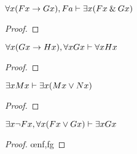 \begin{earg}


\noindent\begin{minipage}{0.99\textwidth}
\item $\forall x(Fx \rightarrow Gx), Fa \vdash \exists x(Fx \mathbin{\&} Gx)$

\begin{proof}
	 \pr{}
	 \pr{}
	 
	 
	 
	 	
\end{proof}
\bigskip
\end{minipage}


\item $\forall x(Gx \rightarrow Hx), \forall xGx \vdash \forall xHx$

\begin{proof}
	 \pr{}
	 \pr{}
	 
	 
	 
	 
\end{proof}
\bigskip


\noindent\begin{minipage}{0.99\textwidth}
\item $\exists xMx \vdash \exists x(Mx \vee Nx)$

\begin{proof}
	 \pr{}
	\open
		 \as{}
		 
		 
	\close
	 
\end{proof}
\bigskip
\end{minipage}


\item $\exists x {\neg} Fx, \forall x(Fx \vee Gx) \vdash \exists xGx$

\begin{proof}
	 \pr{}
	 \pr{}
	\open
		 \as{}
		 
		 \oe{nf,fg}
		 
	\close
	 
\end{proof}
\bigskip


\end{earg}
